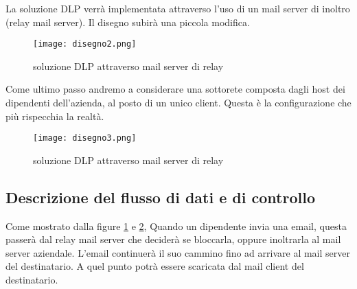   \pagebreak
  La soluzione DLP verrà implementata attraverso l'uso di un mail server di inoltro (relay mail server).
  Il disegno subirà una piccola modifica.

  \begin{figure}[htp]
    \centering
    \texttt{[image: disegno2.png]}
    \caption{soluzione DLP attraverso mail server di relay}\label{disegno2}
  \end{figure}

  Come ultimo passo andremo a considerare una sottorete composta dagli host dei dipendenti dell'azienda, al
  posto di un unico client. Questa è la configurazione che più rispecchia la realtà.

  \begin{figure}[htp]
    \centering
    \texttt{[image: disegno3.png]}
    \caption{soluzione DLP attraverso mail server di relay}\label{disegno3}
  \end{figure}

  \subsection{Descrizione del flusso di dati e di controllo}
  Come mostrato dalla figure \ref{disegno2} e \ref{disegno3}, Quando un dipendente invia una email, questa
  passerà dal relay mail server che deciderà se bloccarla, oppure inoltrarla al mail server aziendale. L'email
  continuerà il suo cammino fino ad arrivare al mail server del destinatario. A quel punto potrà essere scaricata
  dal mail client del destinatario.